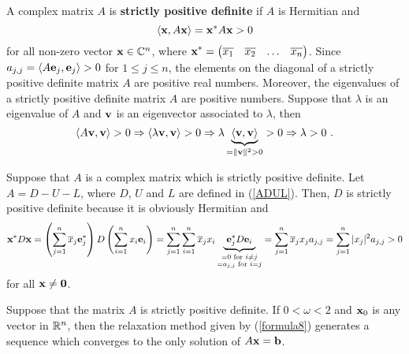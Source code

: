 A \nn complex matrix $A$ is
{\bfseries strictly positive definite} if $A$ is Hermitian and 
\[
\left\langle{\mathbf{x}} , {A\mathbf{x}}\right\rangle = \mathbf{x}^{\ast} A \mathbf{x} > 0
\]
for all non-zero vector $\mathbf{x} \in \mathbb{C}^n$, where
$\displaystyle \mathbf{x}^{\ast} = 
\begin{pmatrix} \overline{x_1} & \overline{x_2} & \ldots & \overline{x_n}
\end{pmatrix}$.  Since
$a_{j,j} = \left\langle{A\mathbf{e}_j} , {\mathbf{e}_j}\right\rangle > 0$ for $1\leq j \leq n$,
the elements on the diagonal of a strictly positive definite matrix $A$ are
positive real numbers.  Moreover, the eigenvalues of a strictly positive
definite matrix $A$ are positive numbers.  Suppose that
$\lambda$ is an eigenvalue of $A$ and $\mathbf{v}$ is an eigenvector
associated to $\lambda$, then
\[
\left\langle{A\mathbf{v}} , {\mathbf{v}}\right\rangle > 0
\Rightarrow \left\langle{\lambda \mathbf{v}} , {\mathbf{v}}\right\rangle > 0  
\Rightarrow \lambda \underbrace{\left\langle{\mathbf{v}} , {\mathbf{v}}\right\rangle}_{=\|\mathbf{v}\|^2>0} > 0  
\Rightarrow \lambda > 0 \ .
\]

\begin{rmk}
Suppose that $A$ is a \nn complex matrix which is strictly
positive definite.  Let $A = D - U - L$, where $D$, $U$ and $L$ are
defined in (\ref{ADUL}).  Then, $D$ is strictly positive definite
because it is obviously Hermitian and 
\[
\mathbf{x}^{\ast} D \mathbf{x} =
\left(\sum_{j=1}^n\overline{x}_j\mathbf{e}_j^\ast \right) D
\left(\sum_{i=1}^n x_i\mathbf{e}_i \right)
= \sum_{j=1}^n \sum_{i=1}^n \overline{x}_j x_i
\underbrace{\ \mathbf{e}_j^\ast D \mathbf{e}_i\ }_{\substack{=0\text{ for }
i\neq j\\=a_{j,j} \text{ for } i=j}}
= \sum_{j=1}^n \overline{x}_j x_j a_{j,j}
= \sum_{j=1}^n |x_j|^2 a_{j,j} > 0
\]
for all $\mathbf{x} \neq \mathbf{0}$.
\label{spd_rmk}
\end{rmk}

\begin{theorem}
Suppose that the \nn matrix $A$ is strictly positive
definite.   If $0 < \omega < 2$ and $\mathbf{x}_{0}$ is any vector in
$\mathbb{R}^n$, then the relaxation method given by (\ref{formula8})
generates a sequence which converges to the only solution of
$A\mathbf{x} = \mathbf{b}$. 
\label{wconv}
\end{theorem}

